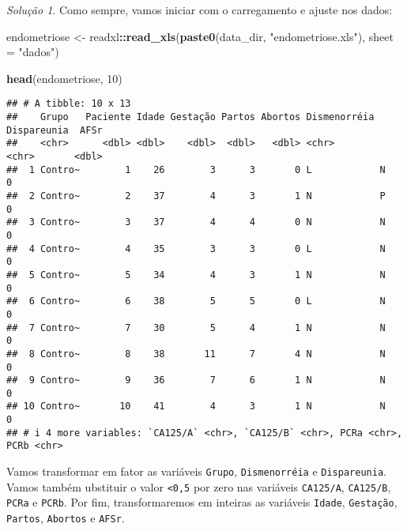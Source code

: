 \documentclass[
]{latex/krantz}
\newenvironment{Shaded}{\begin{snugshade}}{\end{snugshade}}
\newcommand{\AttributeTok}[1]{\textcolor[rgb]{0.13,0.29,0.53}{#1}}
\newcommand{\DecValTok}[1]{\textcolor[rgb]{0.00,0.00,0.81}{#1}}
\newcommand{\FunctionTok}[1]{\textcolor[rgb]{0.13,0.29,0.53}{\textbf{#1}}}
\newcommand{\NormalTok}[1]{#1}
\newcommand{\OtherTok}[1]{\textcolor[rgb]{0.56,0.35,0.01}{#1}}
\newcommand{\SpecialCharTok}[1]{\textcolor[rgb]{0.81,0.36,0.00}{\textbf{#1}}}
\newcommand{\StringTok}[1]{\textcolor[rgb]{0.31,0.60,0.02}{#1}}
\theoremstyle{definition}
\theoremstyle{definition}
\theoremstyle{definition}
\theoremstyle{definition}
\theoremstyle{remark}
\newtheorem*{solution}{Solução}
\begin{document}
\begin{solution}
Como sempre, vamos iniciar com o carregamento e ajuste nos dados:

\begin{Shaded}
\begin{Highlighting}[]
\NormalTok{endometriose }\OtherTok{\textless{}{-}}\NormalTok{ readxl}\SpecialCharTok{::}\FunctionTok{read\_xls}\NormalTok{(}\FunctionTok{paste0}\NormalTok{(data\_dir, }\StringTok{"endometriose.xls"}\NormalTok{), }\AttributeTok{sheet =} \StringTok{"dados"}\NormalTok{)}

\FunctionTok{head}\NormalTok{(endometriose, }\DecValTok{10}\NormalTok{)}
\end{Highlighting}
\end{Shaded}

\begin{verbatim}
## # A tibble: 10 x 13
##    Grupo   Paciente Idade Gestação Partos Abortos Dismenorréia Dispareunia  AFSr
##    <chr>      <dbl> <dbl>    <dbl>  <dbl>   <dbl> <chr>        <chr>       <dbl>
##  1 Contro~        1    26        3      3       0 L            N               0
##  2 Contro~        2    37        4      3       1 N            P               0
##  3 Contro~        3    37        4      4       0 N            N               0
##  4 Contro~        4    35        3      3       0 L            N               0
##  5 Contro~        5    34        4      3       1 N            N               0
##  6 Contro~        6    38        5      5       0 L            N               0
##  7 Contro~        7    30        5      4       1 N            N               0
##  8 Contro~        8    38       11      7       4 N            N               0
##  9 Contro~        9    36        7      6       1 N            N               0
## 10 Contro~       10    41        4      3       1 N            N               0
## # i 4 more variables: `CA125/A` <chr>, `CA125/B` <chr>, PCRa <chr>, PCRb <chr>
\end{verbatim}

Vamos transformar em fator as variáveis \texttt{Grupo}, \texttt{Dismenorréia} e \texttt{Dispareunia}. Vamos também ubstituir o valor \texttt{\textless{}0,5} por zero nas variáveis \texttt{CA125/A}, \texttt{CA125/B}, \texttt{PCRa} e \texttt{PCRb}. Por fim, transformaremos em inteiras as variáveis \texttt{Idade}, \texttt{Gestação}, \texttt{Partos}, \texttt{Abortos} e \texttt{AFSr}.


\end{solution}
\end{document}
